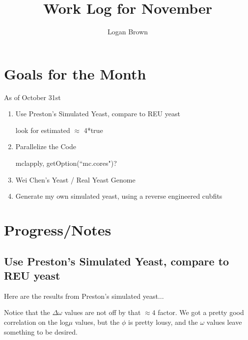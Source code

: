 

\title{Work Log for November}
\author{Logan Brown}


\maketitle
\tableofcontents

\newpage


\section{Goals for the Month}
As of October 31st
\begin{enumerate}
\item Use Preston's Simulated Yeast, compare to REU yeast

look for estimated $\approx$ 4*true
\item Parallelize the Code

mclapply, getOption(``mc.cores")?
\item Wei Chen's Yeast / Real Yeast Genome
\item Generate my own simulated yeast, using a reverse engineered cubfits
\end{enumerate}

\section{Progress/Notes}

\subsection{Use Preston's Simulated Yeast, compare to REU yeast}

Here are the results from Preston's simulated yeast...

Notice that the $\Delta\omega$ values are not off by that $\approx4$ factor. We got a pretty good correlation on the log$\mu$ values, but the $\phi$ is pretty lousy, and the $\omega$ values leave something to be desired.











